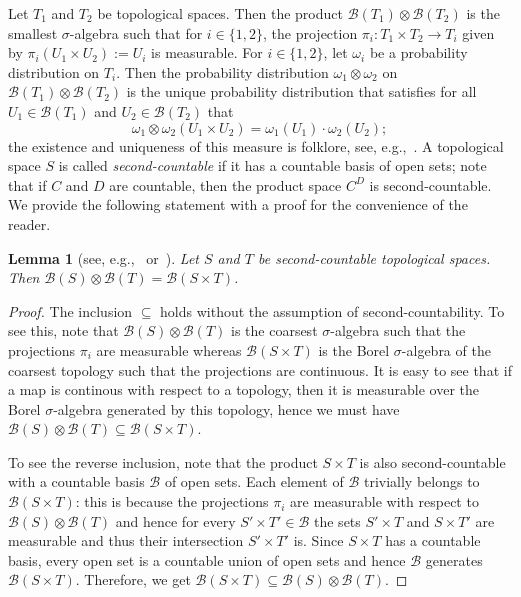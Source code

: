 \documentclass[nonacm]{acmart}
\newtheorem{lemma}[theorem]{Lemma}
\begin{document}
Let $T_1$ and $T_2$ be topological spaces. 
Then the product ${\mathcal B}(T_1) \otimes {\mathcal B}(T_2)$ is the  
smallest $\sigma$-algebra such that for $i\in\{1,2\}$, the projection $\pi_i \colon T_1 \times T_2 \to T_i$ given by
$\pi_i(U_1 \times U_2) := U_i$ is measurable.
For $i \in \{1,2\}$, let $\omega_i$ be 
a probability distribution on $T_i$. Then the probability distribution $\omega_1 \otimes \omega_2$ on $\mathcal{B}(T_1) \otimes \mathcal{B}(T_2)$ is the unique probability distribution that satisfies for all $U_1 \in \mathcal{B}(T_1)$ and $U_2 \in \mathcal{B}(T_2)$ that 
\[\omega_1 \otimes \omega_2(U_1 \times U_2) = \omega_1(U_1) \cdot \omega_2(U_2); \]
the existence and uniqueness of this measure
is folklore, see, e.g.,~\cite[Theorem 14.14]{ProbTheory-Klenke}.
A topological space $S$ is called \emph{second-countable} if it has a countable basis of open sets; note that if $C$ and $D$ are countable, then  the product space $C^D$ is second-countable. We provide the following statement with a proof for the convenience of the reader.




\begin{lemma}[{see, e.g.,~\cite[Volume II, Lemma 6.4.2]{BogachevBook} or~\cite[Lemma D.1.1]{GheysensThesis}}]\label{lem:borel-prod}
Let $S$ and $T$ be second-countable topological spaces. Then ${\mathcal B}(S) \otimes {\mathcal B}(T) = {\mathcal B}(S \times T)$.
\end{lemma}
\begin{proof}
The inclusion $\subseteq$ holds without the assumption of second-countability. To see this, note that ${\mathcal B}(S) \otimes {\mathcal B}(T)$ is the coarsest $\sigma$-algebra such that the projections $\pi_i$ are measurable whereas ${\mathcal B}(S \times T)$ is the Borel $\sigma$-algebra of the coarsest topology such that the projections are continuous. It is easy to see that if a map is continous with respect to a topology, then it is measurable over the Borel $\sigma$-algebra generated by this topology, hence we must have ${\mathcal B}(S) \otimes {\mathcal B}(T) \subseteq {\mathcal B}(S \times T)$.

To see the reverse inclusion, note that the product $S \times T$ is also second-countable with a countable basis $\mathscr{B}$ of open sets. Each element of $\mathscr B$ trivially belongs to ${\mathcal B}(S \times T)$: this is because the projections $\pi_i$ are measurable with respect to $\mathcal{B}(S) \otimes {\mathcal B}(T)$ and hence for every $S' \times T' \in \mathscr B$ the sets $S' \times T$ and $S \times T'$ are measurable and thus their intersection $S'\times T'$ is. Since $S \times T$ has a countable basis, every open set is a countable union of open sets and hence $\mathscr B$ generates $\mathcal{B}(S \times T)$. Therefore, we get ${\mathcal B}(S \times T) \subseteq {\mathcal B}(S) \otimes {\mathcal B}(T)$.
\end{proof} 
\end{document}
